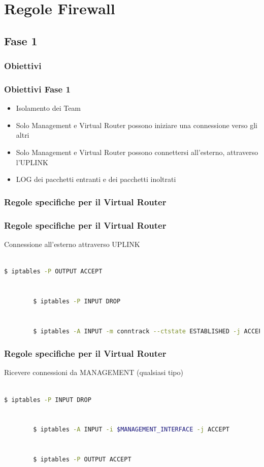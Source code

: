 \documentclass{beamer}
\begin{document}
\section{Regole Firewall}




\subsection{Fase 1}
\subsubsection{Obiettivi}
\begin{frame}
    \frametitle{Obiettivi Fase 1}
    \begin{itemize}
        \item<1-> Isolamento dei Team
        \item<2-> Solo Management e Virtual Router possono iniziare una connessione verso gli altri
        \item<3-> Solo Management e Virtual Router possono connettersi all'esterno, attraverso l'UPLINK
        \item<4-> LOG dei pacchetti entranti e dei pacchetti inoltrati
    \end{itemize}

\end{frame}

\lstset{style=mystyle}
\subsubsection{Regole specifiche per il Virtual Router}
\begin{frame}[fragile]
    \frametitle{Regole specifiche per il Virtual Router}
    Connessione all'esterno attraverso UPLINK
    \\~\\
    \begin{lstlisting}[language=sh]
        $ iptables -P OUTPUT ACCEPT

        
        $ iptables -P INPUT DROP
        

        $ iptables -A INPUT -m conntrack --ctstate ESTABLISHED -j ACCEPT           
    \end{lstlisting}
\end{frame}

\begin{frame}[fragile]
    \frametitle{Regole specifiche per il Virtual Router}
    Ricevere connessioni da MANAGEMENT (qualsiasi tipo)
    \\~\\
    \begin{lstlisting}[language=sh]
        $ iptables -P INPUT DROP
        
        
        $ iptables -A INPUT -i $MANAGEMENT_INTERFACE -j ACCEPT
        
        
        $ iptables -P OUTPUT ACCEPT           
    \end{lstlisting}
\end{frame}
\end{document}
